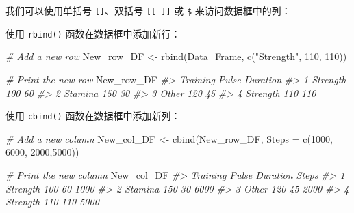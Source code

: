 \documentclass[
]{book}
\newenvironment{Shaded}{\begin{snugshade}}{\end{snugshade}}
\newcommand{\AttributeTok}[1]{\textcolor[rgb]{0.77,0.63,0.00}{#1}}
\newcommand{\CommentTok}[1]{\textcolor[rgb]{0.56,0.35,0.01}{\textit{#1}}}
\newcommand{\DecValTok}[1]{\textcolor[rgb]{0.00,0.00,0.81}{#1}}
\newcommand{\FunctionTok}[1]{\textcolor[rgb]{0.00,0.00,0.00}{#1}}
\newcommand{\NormalTok}[1]{#1}
\newcommand{\OtherTok}[1]{\textcolor[rgb]{0.56,0.35,0.01}{#1}}
\newcommand{\SpecialCharTok}[1]{\textcolor[rgb]{0.00,0.00,0.00}{#1}}
\newcommand{\StringTok}[1]{\textcolor[rgb]{0.31,0.60,0.02}{#1}}
\begin{document}
我们可以使用单括号 \texttt{{[}{]}}、双括号 \texttt{{[}{[}\ {]}{]}} 或 \texttt{\$} 来访问数据框中的列：

\begin{Shaded}
\end{Shaded}

使用 \texttt{rbind()} 函数在数据框中添加新行：

\begin{Shaded}
\begin{Highlighting}[]
\CommentTok{\# Add a new row}
\NormalTok{New\_row\_DF }\OtherTok{\textless{}{-}} \FunctionTok{rbind}\NormalTok{(Data\_Frame, }\FunctionTok{c}\NormalTok{(}\StringTok{"Strength"}\NormalTok{, }\DecValTok{110}\NormalTok{, }\DecValTok{110}\NormalTok{))}

\CommentTok{\# Print the new row}
\NormalTok{New\_row\_DF}
\CommentTok{\#\textgreater{}   Training Pulse Duration}
\CommentTok{\#\textgreater{} 1 Strength   100       60}
\CommentTok{\#\textgreater{} 2  Stamina   150       30}
\CommentTok{\#\textgreater{} 3    Other   120       45}
\CommentTok{\#\textgreater{} 4 Strength   110      110}
\end{Highlighting}
\end{Shaded}

使用 \texttt{cbind()} 函数在数据框中添加新列：

\begin{Shaded}
\begin{Highlighting}[]
\CommentTok{\# Add a new column}
\NormalTok{New\_col\_DF }\OtherTok{\textless{}{-}} \FunctionTok{cbind}\NormalTok{(New\_row\_DF, }\AttributeTok{Steps =} \FunctionTok{c}\NormalTok{(}\DecValTok{1000}\NormalTok{, }\DecValTok{6000}\NormalTok{, }\DecValTok{2000}\NormalTok{,}\DecValTok{5000}\NormalTok{))}

\CommentTok{\# Print the new column}
\NormalTok{New\_col\_DF}
\CommentTok{\#\textgreater{}   Training Pulse Duration Steps}
\CommentTok{\#\textgreater{} 1 Strength   100       60  1000}
\CommentTok{\#\textgreater{} 2  Stamina   150       30  6000}
\CommentTok{\#\textgreater{} 3    Other   120       45  2000}
\CommentTok{\#\textgreater{} 4 Strength   110      110  5000}
\end{Highlighting}
\end{Shaded}
\end{document}
